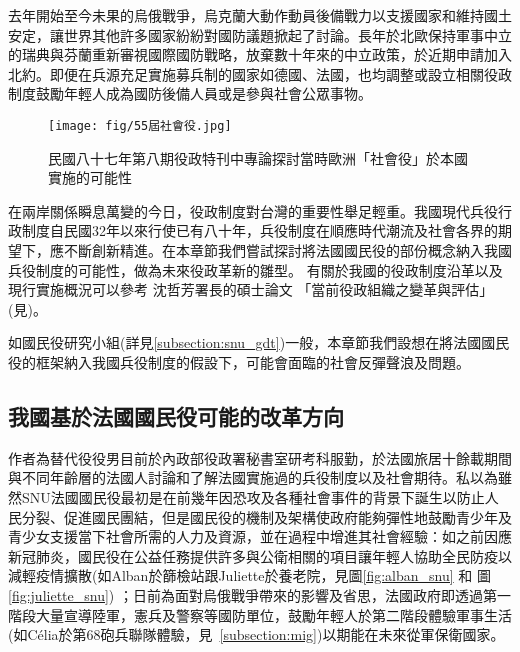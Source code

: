 \documentclass[a4paper,14pt]{extarticle}
\theoremstyle{plain}
\theoremstyle{remark}
\numberwithin{equation}{section}
\begin{document}
去年開始至今未果的烏俄戰爭，烏克蘭大動作動員後備戰力以支援國家和維持國土安定，讓世界其他許多國家紛紛對國防議題掀起了討論。長年於北歐保持軍事中立的瑞典與芬蘭重新審視國際國防戰略，放棄數十年來的中立政策，於近期申請加入北約。即便在兵源充足實施募兵制的國家如德國、法國，也均調整或設立相關役政制度鼓勵年輕人成為國防後備人員或是參與社會公眾事物。

\begin{figure}[H]
  \begin{center}
    \texttt{[image: fig/55屆社會役.jpg]}
  \end{center}
  \caption{民國八十七年第八期役政特刊中專論探討當時歐洲「社會役」於本國實施的可能性}
\end{figure}

在兩岸關係瞬息萬變的今日，役政制度對台灣的重要性舉足輕重。我國現代兵役行政制度自民國32年以來行使已有八十年，兵役制度在順應時代潮流及社會各界的期望下，應不斷創新精進。在本章節我們嘗試探討將法國國民役的部份概念納入我國兵役制度的可能性，做為未來役政革新的雛型。
有關於我國的役政制度沿革以及現行實施概況可以參考
沈哲芳署長的碩士論文 「當前役政組織之變革與評估」(見\cite{shen_master_thesis})。
\par 

如國民役研究小組(詳見\ref{subsection:snu_gdt})一般，本章節我們設想在將法國國民役的框架納入我國兵役制度的假設下，可能會面臨的社會反彈聲浪及問題。

\subsection{我國基於法國國民役可能的改革方向}


作者為替代役役男目前於內政部役政署秘書室研考科服勤，於法國旅居十餘載期間與不同年齡層的法國人討論和了解法國實施過的兵役制度以及社會期待。私以為雖然SNU法國國民役最初是在前幾年因恐攻及各種社會事件的背景下誕生以防止人民分裂、促進國民團結，但是國民役的機制及架構使政府能夠彈性地鼓勵青少年及青少女支援當下社會所需的人力及資源，並在過程中增進其社會經驗：如之前因應新冠肺炎，國民役在公益任務提供許多與公衛相關的項目讓年輕人協助全民防疫以減輕疫情擴散(如Alban於篩檢站跟Juliette於養老院，見圖\ref{fig:alban_snu} 和 圖\ref{fig:juliette_snu})
；日前為面對烏俄戰爭帶來的影響及省思，法國政府即透過第一階段大量宣導陸軍，憲兵及警察等國防單位，鼓勵年輕人於第二階段體驗軍事生活(如Célia於第68砲兵聯隊體驗，見~\ref{subsection:mig})以期能在未來從軍保衛國家。
\end{document}

